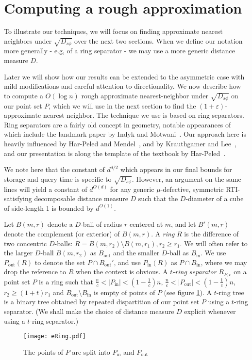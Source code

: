 \documentclass[11pt]{myclass}
\newcommand{\sbreg}{\ensuremath{D_{s\phi}}}
\newcommand{\eps}{\varepsilon}
\begin{document}
\section{Computing a rough approximation}\label{sec:ringsec}
To illustrate our techniques, we will focus on finding approximate nearest neighbors under $\sqrt{\sbreg}$ over the next
two sections. When we define our notation more generally - e.g, of a ring separator - we may use a more generic distance measure
$D$.



Later we will show how our results can be extended to the asymmetric case with mild modifications and careful attention to
directionality.
We now describe how to compute a $O(\log n)$ 
rough approximate nearest-neighbor under $\sqrt{\sbreg}$ on our point set $P$, 
which we will use in the next section to find the $(1+\eps)$-approximate nearest neighbor. 
The technique we use is based on ring separators. Ring separators are a fairly old concept in geometry, 
notable appearances of which include the landmark paper by Indyk and Motwani~\cite{indykmotwani}. 
Our approach here is heavily influenced by Har-Peled and Mendel~\cite{peledmendel}, 
and by Krauthgamer and Lee~\cite{blackbox}, 
and our presentation is along the template of the textbook by Har-Peled~\cite[Chapter 11]{snotes}.
 
We note here that the constant of $d^{d/2}$ which appears in our final bounds for storage and query time
 is specific to $\sqrt{\sbreg}$. However, an argument on the same lines will yield a constant of $d^{O(d)}$
for any generic $\mu$-defective, symmetric RTI-satisfying decomposable distance measure $D$ such that 
the $D$-diameter of a cube of side-length $1$ is bounded by $d^{O(1)}$. 

Let $B(m,r)$ denote a $D$-ball of radius $r$ centered at $m$, and let $B'(m,r)$ denote the complement
 (or exterior) of $B(m,r)$. A \emph{ring} $R$ is the difference of two concentric $D$-balls: 
$R = B(m, r_2) \setminus B(m, r_1), r_2 \ge r_1$. We will often refer to the larger $D$-ball $B(m, r_2)$ 
as $B_{\text{out}}$ and the smaller $D$-ball as $B_{\text{in}}$. We use $P_{\text{out}}(R)$ to denote the set
 $P \cap B_{\text{out}}'$, and use $P_{\text{in}}(R)$ as $P \cap B_{\text{in}}$, where
 we may drop the reference to $R$ when the context is obvious. 
A \emph{$t$-ring separator} $R_{P,c}$ on a point set $P$ is a ring such that 
$\frac{n}{c} < |P_{\text{in}}| < (1 - \frac{1}{c})n $, $\frac{n}{c} < |P_{\text{out}}| < (1 - \frac{1}{c})n$, 
$r_2 \geq (1 + t) r_1$ and $B_{\text{out}} \setminus B_{\text{in}}$ is empty of points of $P$ (see figure \ref{eRing}). A $t$-ring tree is a binary tree obtained
by repeated dispartition of our point set $P$ using a $t$-ring separator. (We shall make the choice of distance measure $D$
explicit whenever using a $t$-ring separator.)
\begin{figure}[H]
  \begin{center}
    \texttt{[image: eRing.pdf]}
  \end{center}
  \caption{The points of $P$ are split into $P_{\text{in}}$ and $P_{\text{out}}$}
  \label{eRing}
\end{figure}
\end{document}
